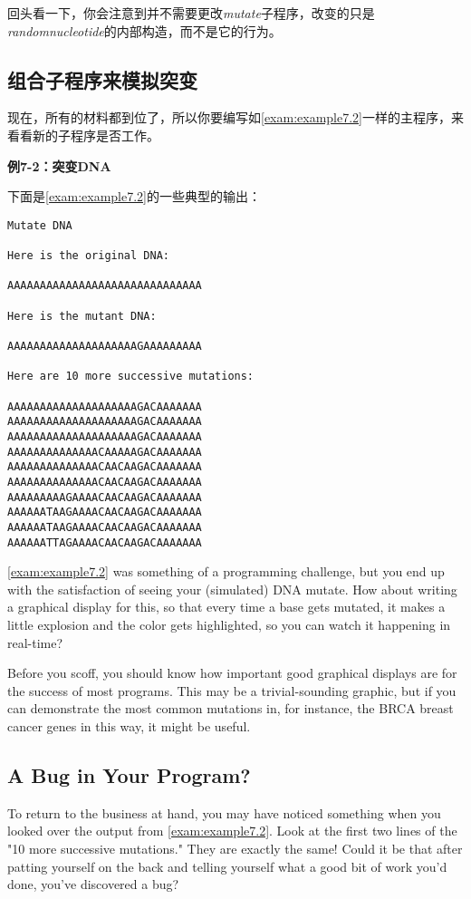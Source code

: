 回头看一下，你会注意到并不需要更改\textit{mutate}子程序，改变的只是\textit{randomnucleotide}的内部构造，而不是它的行为。

\subsection{组合子程序来模拟突变}
现在，所有的材料都到位了，所以你要编写如\autoref{exam:example7.2}一样的主程序，来看看新的子程序是否工作。

\textbf{例7-2：突变DNA}


下面是\autoref{exam:example7.2}的一些典型的输出：

\begin{lstlisting}
Mutate DNA

Here is the original DNA:

AAAAAAAAAAAAAAAAAAAAAAAAAAAAAA

Here is the mutant DNA:

AAAAAAAAAAAAAAAAAAAAGAAAAAAAAA

Here are 10 more successive mutations:

AAAAAAAAAAAAAAAAAAAAGACAAAAAAA
AAAAAAAAAAAAAAAAAAAAGACAAAAAAA
AAAAAAAAAAAAAAAAAAAAGACAAAAAAA
AAAAAAAAAAAAAACAAAAAGACAAAAAAA
AAAAAAAAAAAAAACAACAAGACAAAAAAA
AAAAAAAAAAAAAACAACAAGACAAAAAAA
AAAAAAAAAGAAAACAACAAGACAAAAAAA
AAAAAATAAGAAAACAACAAGACAAAAAAA
AAAAAATAAGAAAACAACAAGACAAAAAAA
AAAAAATTAGAAAACAACAAGACAAAAAAA
\end{lstlisting}

\autoref{exam:example7.2} was something of a programming challenge, but you end up with the satisfaction of seeing your (simulated) DNA mutate. How about writing a graphical display for this, so that every time a base gets mutated, it makes a little explosion and the color gets highlighted, so you can watch it happening in real-time?

Before you scoff, you should know how important good graphical displays are for the success of most programs. This may be a trivial-sounding graphic, but if you can demonstrate the most common mutations in, for instance, the BRCA breast cancer genes in this way, it might be useful. 

\subsection{A Bug in Your Program?}
To return to the business at hand, you may have noticed something when you looked over the output from \autoref{exam:example7.2}. Look at the first two lines of the "10 more successive mutations." They are exactly the same! Could it be that after patting yourself on the back and telling yourself what a good bit of work you'd done, you've discovered a bug?

